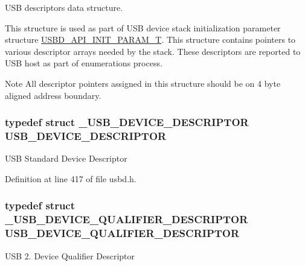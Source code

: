 U\+SB descriptors data structure. 

This structure is used as part of U\+SB device stack initialization parameter structure \hyperlink{group__USBD__Core_gaa6e8171941c1ae63afed95974e0f18e3}{U\+S\+B\+D\+\_\+\+A\+P\+I\+\_\+\+I\+N\+I\+T\+\_\+\+P\+A\+R\+A\+M\+\_\+T}. This structure contains pointers to various descriptor arrays needed by the stack. These descriptors are reported to U\+SB host as part of enumerations process.

\begin{DoxyNote}{Note}
All descriptor pointers assigned in this structure should be on 4 byte aligned address boundary. 
\end{DoxyNote}
\subsubsection[{\texorpdfstring{U\+S\+B\+\_\+\+D\+E\+V\+I\+C\+E\+\_\+\+D\+E\+S\+C\+R\+I\+P\+T\+OR}{USB_DEVICE_DESCRIPTOR}}]{\setlength{\rightskip}{0pt plus 5cm}typedef struct {\bf \+\_\+\+U\+S\+B\+\_\+\+D\+E\+V\+I\+C\+E\+\_\+\+D\+E\+S\+C\+R\+I\+P\+T\+OR} {\bf U\+S\+B\+\_\+\+D\+E\+V\+I\+C\+E\+\_\+\+D\+E\+S\+C\+R\+I\+P\+T\+OR}}\hypertarget{group__USBD__Core_ga7c2da119cc5c129d253d5fa766c70893}{}\label{group__USBD__Core_ga7c2da119cc5c129d253d5fa766c70893}
U\+SB Standard Device Descriptor 

Definition at line 417 of file usbd.\+h.

\subsubsection[{\texorpdfstring{U\+S\+B\+\_\+\+D\+E\+V\+I\+C\+E\+\_\+\+Q\+U\+A\+L\+I\+F\+I\+E\+R\+\_\+\+D\+E\+S\+C\+R\+I\+P\+T\+OR}{USB_DEVICE_QUALIFIER_DESCRIPTOR}}]{\setlength{\rightskip}{0pt plus 5cm}typedef struct {\bf \+\_\+\+U\+S\+B\+\_\+\+D\+E\+V\+I\+C\+E\+\_\+\+Q\+U\+A\+L\+I\+F\+I\+E\+R\+\_\+\+D\+E\+S\+C\+R\+I\+P\+T\+OR} {\bf U\+S\+B\+\_\+\+D\+E\+V\+I\+C\+E\+\_\+\+Q\+U\+A\+L\+I\+F\+I\+E\+R\+\_\+\+D\+E\+S\+C\+R\+I\+P\+T\+OR}}\hypertarget{group__USBD__Core_ga4460a327f0c59c1d44e550efcff1eb00}{}\label{group__USBD__Core_ga4460a327f0c59c1d44e550efcff1eb00}
U\+SB 2. Device Qualifier Descriptor 

